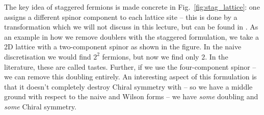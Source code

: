 \documentclass[11pt]{article}
\theoremstyle{definition}
\begin{document}
The key idea of staggered fermions is made concrete in Fig.~\ref{fig:stag_lattice}: one assigns a different spinor component to each lattice site -- this is done by a transformation which we will not discuss in this lecture, but can be found in \cite{rothe2012lattice}. As an example in how we remove doublers with the staggered formulation, we take a 2D lattice with a two-component spinor as shown in the figure. In the naive discretisation we would find $2^2$ fermions, but now we find only $2$. In the literature, these are called tastes. Further, if we use the four-component spinor -- we can remove this doubling entirely. An interesting aspect of this formulation is that it doesn't completely destroy Chiral symmetry with -- so we have a middle ground with respect to the naive and Wilson forms -- we have \textit{some} doubling and \textit{some} Chiral symmetry.
\end{document}
